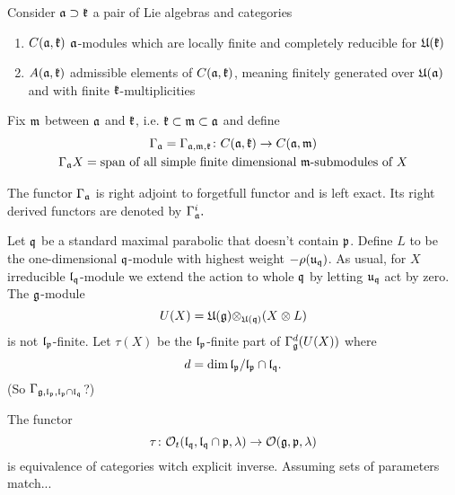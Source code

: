 \documentclass[a4paper,10pt]{article}
\begin{document}
\begin{definition}
 Consider $\mathfrak{a} \supset \mathfrak{k}$ a pair of Lie algebras and categories 
 \begin{enumerate}
  \item $C(\mathfrak{a}, \mathfrak{k})$ $\mathfrak{a}$-modules which are locally finite and completely reducible for $\mathfrak{U(k)}$
  \item $A(\mathfrak{a}, \mathfrak{k})$ admissible elements of $C(\mathfrak{a}, \mathfrak{k})$, meaning finitely generated over $\mathfrak{U(a)}$ and with finite $\mathfrak{k}$-multiplicities
  \end{enumerate}
Fix $\mathfrak{m}$ between $\mathfrak{a}$ and $\mathfrak{k}$, i.e. $\mathfrak{k} \subset \mathfrak{m} \subset \mathfrak{a}$ and define 
\begin{gather*}
 \Gamma_{\mathfrak{a}} = \Gamma_{\mathfrak{a,m,k}} \colon C(\mathfrak{a}, \mathfrak{k}) \to C(\mathfrak{a}, \mathfrak{m}) \\
 \Gamma_{\mathfrak{a}} X = \text{span of all simple finite dimensional $\mathfrak{m}$-submodules of $X$} 
\end{gather*}
\end{definition}

The functor $\Gamma_{\mathfrak{a}}$ is right adjoint to forgetfull functor and is left exact. Its right derived functors are denoted by $\Gamma^i_{\mathfrak{a}}.$


Let $\mathfrak{q}$ be a standard maximal parabolic that doesn't contain $\mathfrak{p}$. Define $L$  to be the one-dimensional $\mathfrak{q}$-module with highest weight $-\rho(\mathfrak{u}_{\mathfrak{q}})$. As usual, for $X$ irreducible $\mathfrak{l}_{\mathfrak{q}}$-module we extend the action to whole $\mathfrak{q}$ by letting $\mathfrak{u}_{\mathfrak{q}}$ act by zero. The $\mathfrak{g}$-module
\[
 U(X) = \mathfrak{U(g)\otimes_{U(q)}} (X\otimes L)
\]
is not $\mathfrak{l}_{\mathfrak{p}}$-finite. Let $\tau(X)$ be the $\mathfrak{l}_{\mathfrak{p}}$-finite part of $\Gamma^d_{\mathfrak{g}} (U(X))$ where
\[
d  = \dim \mathfrak{l}_{\mathfrak{p}}/ \mathfrak{l}_{\mathfrak{p}}\cap\mathfrak{l}_{\mathfrak{q}}. 
\]
(So $\Gamma_{\mathfrak{g}, \mathfrak{l}_{\mathfrak{p}}, \mathfrak{l}_{\mathfrak{p}} \cap \mathfrak{l}_{\mathfrak{q}}}$?)


\begin{theorem}[ES1]
\label{thm:es1}
The functor
 \[
  \tau \colon \mathcal{O}_t (\mathfrak{l}_{\mathfrak{q}}, \mathfrak{l}_{\mathfrak{q}} \cap \mathfrak{p}, \lambda) \to \mathcal{O}(\mathfrak{g}, \mathfrak{p}, \lambda)
 \]
is equivalence of categories witch explicit inverse. Assuming sets of parameters match...
\end{theorem}
\end{document}
